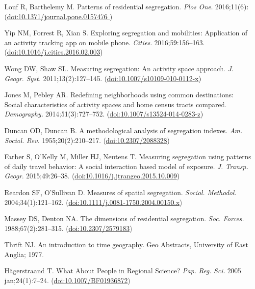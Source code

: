 \documentclass[%
preprint,
 amsmath,amssymb,
pra,
]{revtex4-1}
\begin{document}
\begin{thebibliography}{10}
Louf R, Barthelemy M. Patterns of residential segregation.
\emph{Plos One}. 2016;11(6):(\href{https://dx.doi.org/10.1371/journal.pone.0157476}{doi:10.1371/journal.pone.0157476
})

Yip NM, Forrest R, Xian S. Exploring segregation and mobilities: Application of an activity tracking app on mobile phone.
\emph{Cities}. 2016;59:156--163. (\href{https://dx.doi.org/10.1016/j.cities.2016.02.003}{doi:10.1016/j.cities.2016.02.003})

Wong DW, Shaw SL. Measuring segregation: An activity space approach. \emph{J. Geogr. Syst.} 2011;13(2):127--145. (\href{https://dx.doi.org/10.1007/s10109-010-0112-x}{doi:10.1007/s10109-010-0112-x})

Jones M, Pebley AR. Redefining neighborhoods using common destinations: Social
  characteristics of activity spaces and home census tracts compared. \emph{Demography.} 2014;51(3):727--752. (\href{https://dx.doi.org/10.1007/s13524-014-0283-z}{doi:10.1007/s13524-014-0283-z})

Duncan OD, Duncan B. A methodological analysis of segregation indexes.
\emph{Am. Sociol. Rev.} 1955;20(2):210--217. (\href{https://dx.doi.org/10.2307/2088328}{doi:10.2307/2088328})

Farber S, O'Kelly M, Miller HJ, Neutens T. Measuring segregation using patterns of daily travel behavior: A social interaction based model of exposure. \emph{J. Transp. Geogr.} 2015;49:26--38. (\href{https://dx.doi.org/10.1016/j.jtrangeo.2015.10.009}{doi:10.1016/j.jtrangeo.2015.10.009})

Reardon SF, O'Sullivan D. Measures of spatial segregation. \emph{Sociol. Methodol.} 2004;34(1):121--162. (\href{https://dx.doi.org/10.1111/j.0081-1750.2004.00150.x}{doi:10.1111/j.0081-1750.2004.00150.x})

Massey DS, Denton NA. The dimensions of residential segregation.
\emph{Soc. Forces.} 1988;67(2):281--315. (\href{https://dx.doi.org/10.2307/2579183}{doi:10.2307/2579183})

Thrift NJ. An introduction to time geography. Geo Abstracts, University of East Anglia; 1977. 

H{\"{a}}gerstraand T. What About People in Regional Science? \emph{Pap. Reg. Sci.}  2005 jan;24(1):7--24. (\href{https://dx.doi.org/10.1007/BF01936872}{doi:10.1007/BF01936872})


\end{thebibliography}
\end{document}
